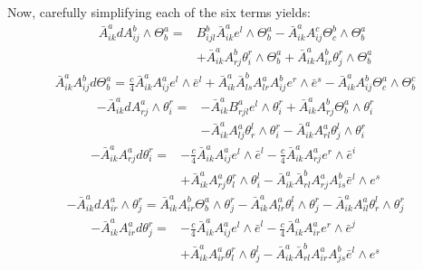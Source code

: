 Now, carefully simplifying each of the six terms yields:
%
\begin{align*}
\bar{A}^a_{ik} d A^b_{ij} \wedge \Theta^a_b =& B^b_{ijl} \bar{A}^a_{ik} e^l \wedge \Theta^a_b - \bar{A}^a_{ik} A^c_{ij} \Theta^b_c \wedge \Theta^a_b\\
&+ \bar{A}^a_{ik} A^b_{rj} \theta^r_i \wedge \Theta^a_b + \bar{A}^a_{ik} A^b_{ir} \theta^r_j \wedge \Theta^a_b
\end{align*}
%
\begin{align*}
\bar{A}^a_{ik} A^b_{ij} d \Theta^a_b = \frac{c}{4} \bar{A}^a_{ik} A^a_{ij} e^l \wedge \bar{e}^l + \bar{A}^a_{ik} \bar{A}^b_{ls} A^a_{lr} A^b_{ij} e^r \wedge \bar{e}^s - \bar{A}^a_{ik} A^b_{ij} \Theta^a_c \wedge \Theta^c_b
\end{align*}
%
\begin{align*}
- \bar{A}^a_{ik} d A^a_{rj} \wedge \theta^r_i =& - \bar{A}^a_{ik} B^a_{rjl} e^l \wedge \theta^r_i + \bar{A}^a_{ik} A^b_{rj} \Theta^a_b \wedge \theta^r_i \\
&- \bar{A}^a_{ik} A^a_{lj} \theta^l_r \wedge \theta^r_i - \bar{A}^a_{ik} A^a_{rl} \theta^l_j \wedge \theta^r_i
\end{align*}
%
\begin{align*}
- \bar{A}^a_{ik} A^a_{rj} d \theta^r_i =& - \frac{c}{4} \bar{A}^a_{ik} A^a_{ij} e^l \wedge \bar{e}^l - \frac{c}{4} \bar{A}^a_{ik} A^a_{rj} e^r \wedge \bar{e}^i \\
&+ \bar{A}^a_{ik} A^a_{rj} \theta^r_l \wedge \theta^l_i - \bar{A}^a_{ik} \bar{A}^b_{rl} A^a_{rj} A^b_{is} \bar{e}^l \wedge e^s
\end{align*}
%
\begin{align*}
- \bar{A}^a_{ik} d A^a_{ir} \wedge \theta^r_j = \bar{A}^a_{ik} A^b_{ir} \Theta^a_b \wedge \theta^r_j - \bar{A}^a_{ik} A^a_{lr} \theta^l_i \wedge \theta^r_j - \bar{A}^a_{ik} A^a_{il} \theta^l_r \wedge \theta^r_j
\end{align*}
%
\begin{align*}
- \bar{A}^a_{ik} A^a_{ir} d \theta^r_j =& - \frac{c}{4} \bar{A}^a_{ik} A^a_{ij} e^l \wedge \bar{e}^l - \frac{c}{4} \bar{A}^a_{ik} A^a_{ir} e^r \wedge \bar{e}^j  \\
&+ \bar{A}^a_{ik} A^a_{ir} \theta^r_l \wedge \theta^l_j - \bar{A}^a_{ik} \bar{A}^b_{rl} A^a_{ir} A^b_{js} \bar{e}^l \wedge e^s
\end{align*}

